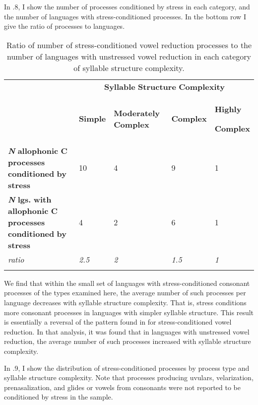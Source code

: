  In .8, I show the number of processes conditioned by stress in each category, and the number of languages with stress-conditioned processes. In the bottom row I give the ratio of processes to languages.






\begin{table}
\begin{tabularx}{\textwidth}{XXXXX}
\lsptoprule
 & \multicolumn{4}{c}{ \textbf{Syllable} \textbf{Structure} \textbf{Complexity}}\\
& \textbf{Simple} & \textbf{Moderately} \textbf{Complex} & \textbf{Complex} & { \textbf{Highly} }

 \textbf{Complex}\\
 \textbf{\textit{N}} \textbf{allophonic} \textbf{C} \textbf{processes} \textbf{conditioned} \textbf{by} \textbf{stress} & 10 & 4 & 9 & 1\\
 \textbf{\textit{N}} \textbf{lgs.} \textbf{with} \textbf{allophonic} \textbf{C} \textbf{processes} \textbf{conditioned} \textbf{by} \textbf{stress} & 4 & 2 & 6 & 1\\
 \textit{ratio} & \textit{2.5} & \textit{2} & \textit{1.5} & \textit{1}\\
\lspbottomrule
\end{tabularx}
\caption{\label{7.8}Ratio of number of stress-conditioned vowel reduction processes to the number of languages with unstressed vowel reduction in each category of syllable structure complexity.}
\end{table}




  We find that within the small set of languages with stress-conditioned consonant processes of the types examined here, the average number of such processes per language decreases with syllable structure complexity. That is, stress conditions more consonant processes in languages with simpler syllable structure. This result is essentially a reversal of the pattern found in  for stress-conditioned vowel reduction. In that analysis, it was found that in languages with unstressed vowel reduction, the average number of such processes increased with syllable structure complexity.



  In .9, I show the distribution of stress-conditioned processes by process type and syllable structure complexity. Note that processes producing uvulars, velarization, prenasalization, and glides or vowels from consonants were not reported to be conditioned by stress in the sample.






